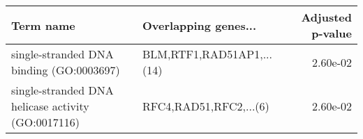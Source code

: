\begin{tabular}{llr}
\toprule
                                         Term name &      Overlapping genes... &  Adjusted p-value \\
\midrule
          single-stranded DNA binding (GO:0003697) & BLM,RTF1,RAD51AP1,...(14) &          2.60e-02 \\
single-stranded DNA helicase activity (GO:0017116) &    RFC4,RAD51,RFC2,...(6) &          2.60e-02 \\
\bottomrule
\end{tabular}
